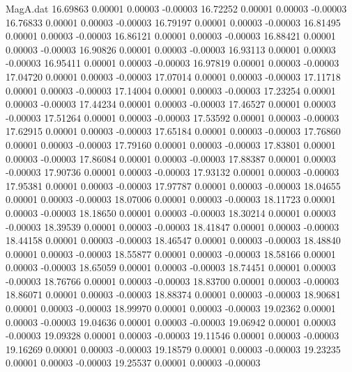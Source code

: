 \begin{filecontents}{MagA.dat}
  16.69863    0.00001    0.00003   -0.00003
  16.72252    0.00001    0.00003   -0.00003
  16.76833    0.00001    0.00003   -0.00003
  16.79197    0.00001    0.00003   -0.00003
  16.81495    0.00001    0.00003   -0.00003
  16.86121    0.00001    0.00003   -0.00003
  16.88421    0.00001    0.00003   -0.00003
  16.90826    0.00001    0.00003   -0.00003
  16.93113    0.00001    0.00003   -0.00003
  16.95411    0.00001    0.00003   -0.00003
  16.97819    0.00001    0.00003   -0.00003
  17.04720    0.00001    0.00003   -0.00003
  17.07014    0.00001    0.00003   -0.00003
  17.11718    0.00001    0.00003   -0.00003
  17.14004    0.00001    0.00003   -0.00003
  17.23254    0.00001    0.00003   -0.00003
  17.44234    0.00001    0.00003   -0.00003
  17.46527    0.00001    0.00003   -0.00003
  17.51264    0.00001    0.00003   -0.00003
  17.53592    0.00001    0.00003   -0.00003
  17.62915    0.00001    0.00003   -0.00003
  17.65184    0.00001    0.00003   -0.00003
  17.76860    0.00001    0.00003   -0.00003
  17.79160    0.00001    0.00003   -0.00003
  17.83801    0.00001    0.00003   -0.00003
  17.86084    0.00001    0.00003   -0.00003
  17.88387    0.00001    0.00003   -0.00003
  17.90736    0.00001    0.00003   -0.00003
  17.93132    0.00001    0.00003   -0.00003
  17.95381    0.00001    0.00003   -0.00003
  17.97787    0.00001    0.00003   -0.00003
  18.04655    0.00001    0.00003   -0.00003
  18.07006    0.00001    0.00003   -0.00003
  18.11723    0.00001    0.00003   -0.00003
  18.18650    0.00001    0.00003   -0.00003
  18.30214    0.00001    0.00003   -0.00003
  18.39539    0.00001    0.00003   -0.00003
  18.41847    0.00001    0.00003   -0.00003
  18.44158    0.00001    0.00003   -0.00003
  18.46547    0.00001    0.00003   -0.00003
  18.48840    0.00001    0.00003   -0.00003
  18.55877    0.00001    0.00003   -0.00003
  18.58166    0.00001    0.00003   -0.00003
  18.65059    0.00001    0.00003   -0.00003
  18.74451    0.00001    0.00003   -0.00003
  18.76766    0.00001    0.00003   -0.00003
  18.83700    0.00001    0.00003   -0.00003
  18.86071    0.00001    0.00003   -0.00003
  18.88374    0.00001    0.00003   -0.00003
  18.90681    0.00001    0.00003   -0.00003
  18.99970    0.00001    0.00003   -0.00003
  19.02362    0.00001    0.00003   -0.00003
  19.04636    0.00001    0.00003   -0.00003
  19.06942    0.00001    0.00003   -0.00003
  19.09328    0.00001    0.00003   -0.00003
  19.11546    0.00001    0.00003   -0.00003
  19.16269    0.00001    0.00003   -0.00003
  19.18579    0.00001    0.00003   -0.00003
  19.23235    0.00001    0.00003   -0.00003
  19.25537    0.00001    0.00003   -0.00003

\end{filecontents}
